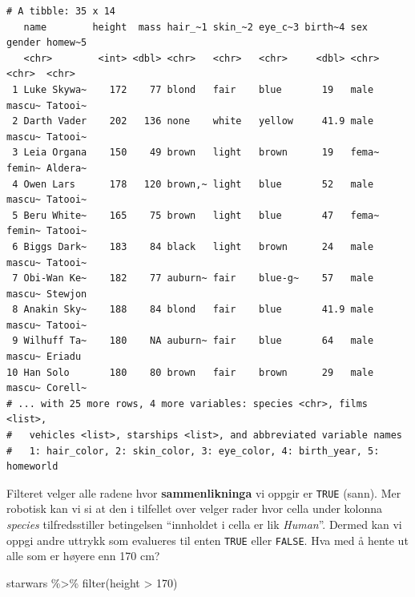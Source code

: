 \documentclass[
  letterpaper,
  DIV=11,
  numbers=noendperiod]{scrreprt}
\newenvironment{Shaded}{\begin{snugshade}}{\end{snugshade}}
\newcommand{\DecValTok}[1]{\textcolor[rgb]{0.68,0.00,0.00}{#1}}
\newcommand{\FunctionTok}[1]{\textcolor[rgb]{0.28,0.35,0.67}{#1}}
\newcommand{\NormalTok}[1]{\textcolor[rgb]{0.00,0.23,0.31}{#1}}
\newcommand{\SpecialCharTok}[1]{\textcolor[rgb]{0.37,0.37,0.37}{#1}}
\begin{document}
\begin{verbatim}
# A tibble: 35 x 14
   name        height  mass hair_~1 skin_~2 eye_c~3 birth~4 sex   gender homew~5
   <chr>        <int> <dbl> <chr>   <chr>   <chr>     <dbl> <chr> <chr>  <chr>  
 1 Luke Skywa~    172    77 blond   fair    blue       19   male  mascu~ Tatooi~
 2 Darth Vader    202   136 none    white   yellow     41.9 male  mascu~ Tatooi~
 3 Leia Organa    150    49 brown   light   brown      19   fema~ femin~ Aldera~
 4 Owen Lars      178   120 brown,~ light   blue       52   male  mascu~ Tatooi~
 5 Beru White~    165    75 brown   light   blue       47   fema~ femin~ Tatooi~
 6 Biggs Dark~    183    84 black   light   brown      24   male  mascu~ Tatooi~
 7 Obi-Wan Ke~    182    77 auburn~ fair    blue-g~    57   male  mascu~ Stewjon
 8 Anakin Sky~    188    84 blond   fair    blue       41.9 male  mascu~ Tatooi~
 9 Wilhuff Ta~    180    NA auburn~ fair    blue       64   male  mascu~ Eriadu 
10 Han Solo       180    80 brown   fair    brown      29   male  mascu~ Corell~
# ... with 25 more rows, 4 more variables: species <chr>, films <list>,
#   vehicles <list>, starships <list>, and abbreviated variable names
#   1: hair_color, 2: skin_color, 3: eye_color, 4: birth_year, 5: homeworld
\end{verbatim}

Filteret velger alle radene hvor \textbf{sammenlikninga} vi oppgir er
\texttt{TRUE} (sann). Mer robotisk kan vi si at den i tilfellet over
velger rader hvor cella under kolonna \emph{species} tilfredsstiller
betingelsen ``innholdet i cella er lik \emph{Human}''. Dermed kan vi
oppgi andre uttrykk som evalueres til enten \texttt{TRUE} eller
\texttt{FALSE}. Hva med å hente ut alle som er høyere enn 170 cm?

\begin{Shaded}
\begin{Highlighting}[]
\NormalTok{starwars }\SpecialCharTok{\%\textgreater{}\%} \FunctionTok{filter}\NormalTok{(height }\SpecialCharTok{\textgreater{}} \DecValTok{170}\NormalTok{)}
\end{Highlighting}
\end{Shaded}
\end{document}

